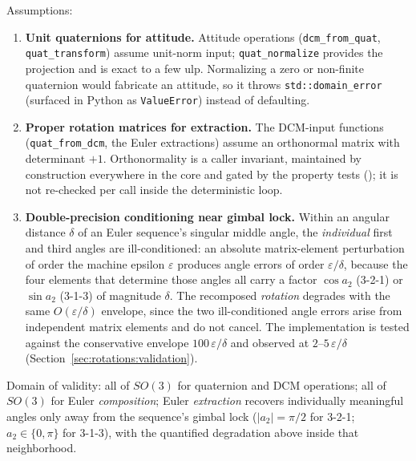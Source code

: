 Assumptions:
\begin{enumerate}
  \item \textbf{Unit quaternions for attitude.} Attitude operations
    (\texttt{dcm\_from\_quat}, \texttt{quat\_transform}) assume unit-norm
    input; \texttt{quat\_normalize} provides the projection and is exact
    to a few ulp. Normalizing a zero or non-finite quaternion would
    fabricate an attitude, so it throws \texttt{std::domain\_error}
    (surfaced in Python as \texttt{ValueError}) instead of defaulting.
  \item \textbf{Proper rotation matrices for extraction.} The DCM-input
    functions (\texttt{quat\_from\_dcm}, the Euler extractions) assume an
    orthonormal matrix with determinant $+1$. Orthonormality is a caller
    invariant, maintained by construction everywhere in the core and gated
    by the property tests ();
    it is not re-checked per call inside the deterministic loop.
  \item \textbf{Double-precision conditioning near gimbal lock.} Within an
    angular distance $\delta$ of an Euler sequence's singular middle angle,
    the \emph{individual} first and third angles are ill-conditioned: an
    absolute matrix-element perturbation of order the machine epsilon
    $\varepsilon$ produces angle errors of order $\varepsilon/\delta$,
    because the four elements that determine those angles all carry a
    factor $\cos a_2$ (3-2-1) or $\sin a_2$ (3-1-3) of magnitude $\delta$.
    The recomposed \emph{rotation} degrades with the same $O(\varepsilon/
    \delta)$ envelope, since the two ill-conditioned angle errors arise
    from independent matrix elements and do not cancel. The implementation
    is tested against the conservative envelope $100\,\varepsilon/\delta$
    and observed at $2$--$5\,\varepsilon/\delta$
    (Section~\ref{sec:rotations:validation}).
\end{enumerate}

Domain of validity: all of $SO(3)$ for quaternion and DCM operations; all
of $SO(3)$ for Euler \emph{composition}; Euler \emph{extraction} recovers
individually meaningful angles only away from the sequence's gimbal lock
($|a_2| = \pi/2$ for 3-2-1; $a_2 \in \{0, \pi\}$ for 3-1-3), with the
quantified degradation above inside that neighborhood.

